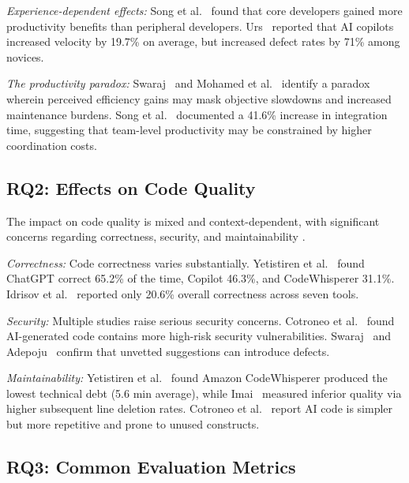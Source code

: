 \documentclass[journal,twoside,10pt]{IEEEtran}
\begin{document}
\textit{Experience-dependent effects:} Song et al.~\cite{song2024opensource}
found that core developers gained more productivity benefits than peripheral
developers. Urs~\cite{urs2025trust} reported that AI copilots increased velocity
by 19.7\% on average, but increased defect rates by 71\% among novices.

\textit{The productivity paradox:} Swaraj~\cite{swaraj2025llm} and Mohamed et
al.~\cite{mohamed2025slr} identify a paradox wherein perceived efficiency gains
may mask objective slowdowns and increased maintenance burdens. Song et
al.~\cite{song2024opensource} documented a 41.6\% increase in integration time,
suggesting that team-level productivity may be constrained by higher coordination
costs.

\subsection{RQ2: Effects on Code Quality}

The impact on code quality is mixed and context-dependent, with significant
concerns regarding correctness, security, and maintainability
\cite{adepoju2023copilot,swaraj2025llm,urs2025trust,idrisov2024codegen,%
imai2022copilot,cotroneo2025defects,yetistiren2023quality}.

\textit{Correctness:} Code correctness varies substantially. Yetistiren et
al.~\cite{yetistiren2023quality} found ChatGPT correct 65.2\% of the time,
Copilot 46.3\%, and CodeWhisperer 31.1\%. Idrisov et
al.~\cite{idrisov2024codegen} reported only 20.6\% overall correctness across
seven tools.

\textit{Security:} Multiple studies raise serious security concerns. Cotroneo et
al.~\cite{cotroneo2025defects} found AI-generated code contains more high-risk
security vulnerabilities. Swaraj~\cite{swaraj2025llm} and Adepoju~\cite{adepoju2023copilot}
confirm that unvetted suggestions can introduce defects.

\textit{Maintainability:} Yetistiren et al.~\cite{yetistiren2023quality} found
Amazon CodeWhisperer produced the lowest technical debt (5.6 min average),
while Imai~\cite{imai2022copilot} measured inferior quality via higher
subsequent line deletion rates. Cotroneo et al.~\cite{cotroneo2025defects}
report AI code is simpler but more repetitive and prone to unused constructs.

\subsection{RQ3: Common Evaluation Metrics}
\end{document}
